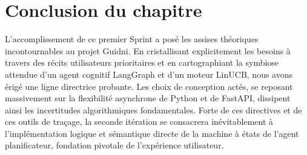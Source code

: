 \section{Conclusion du chapitre}

L'accomplissement de ce premier Sprint a posé les assises théoriques incontournables au projet Guidni. En cristallisant explicitement les besoins à travers des récits utilisateurs prioritaires et en cartographiant la symbiose attendue d'un agent cognitif LangGraph et d'un moteur LinUCB, nous avons érigé une ligne directrice probante. Les choix de conception actés, se reposant massivement sur la flexibilité asynchrone de Python et de FastAPI, dissipent ainsi les incertitudes algorithmiques fondamentales. Forte de ces directives et de ces outils de traçage, la seconde itération se consacrera inévitablement à l'implémentation logique et sémantique directe de la machine à états de l'agent planificateur, fondation pivotale de l'expérience utilisateur.
